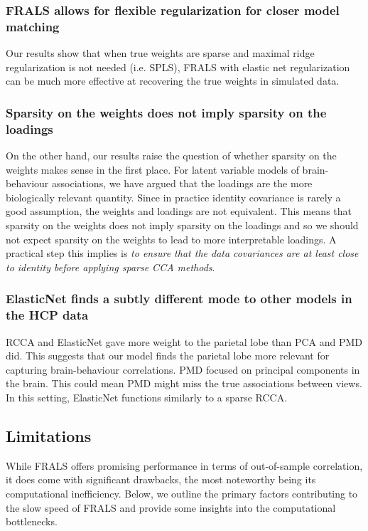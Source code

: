 \subsubsection{FRALS allows for flexible regularization for closer model matching}

Our results show that when true weights are sparse and maximal ridge regularization is not needed (i.e. SPLS), FRALS with elastic net regularization can be much more effective at recovering the true weights in simulated data.

\subsubsection{Sparsity on the weights does not imply sparsity on the loadings}

On the other hand, our results raise the question of whether sparsity on the weights makes sense in the first place.
For latent variable models of brain-behaviour associations, we have argued that the loadings are the more biologically relevant quantity.
Since in practice identity covariance is rarely a good assumption, the weights and loadings are not equivalent.
This means that sparsity on the weights does not imply sparsity on the loadings and so we should not expect sparsity on the weights to lead to more interpretable loadings.
A practical step this implies is \textit{to ensure that the data covariances are at least close to identity before applying sparse CCA methods}.

\subsubsection{ElasticNet finds a subtly different mode to other models in the HCP data}

RCCA and ElasticNet gave more weight to the parietal lobe than PCA and PMD did.
This suggests that our model finds the parietal lobe more relevant for capturing brain-behaviour correlations.
PMD focused on principal components in the brain.
This could mean PMD might miss the true associations between views.
In this setting, ElasticNet functions similarly to a sparse RCCA.

\subsection{Limitations}
While FRALS offers promising performance in terms of out-of-sample correlation, it does come with significant drawbacks, the most noteworthy being its computational inefficiency.
Below, we outline the primary factors contributing to the slow speed of FRALS and provide some insights into the computational bottlenecks.

